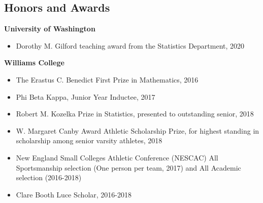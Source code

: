 \documentclass[margin, 10pt]{res} %
\begin{document}
\begin{resume}
{%


\section{Honors and Awards}
{\textbf{University of Washington}}
\begin{itemize}
\item Dorothy M. Gilford teaching award from the Statistics Department, 2020
\end{itemize}
{\textbf{Williams College}}
\begin{itemize}
\item The Erastus C. Benedict First Prize in Mathematics, 2016
\item Phi Beta Kappa, Junior Year Inductee, 2017
\item Robert M. Kozelka Prize in Statistics, presented to outstanding senior, 2018
\item W. Margaret Canby Award Athletic Scholarship Prize, for highest standing in scholarship among senior varsity athletes, 2018
\item New England Small Colleges Athletic Conference (NESCAC) All Sportsmanship selection (One person per team, 2017) and All Academic selection (2016-2018)
\item Clare Booth Luce Scholar, 2016-2018
\end{itemize}

}
\end{resume}
\end{document}
